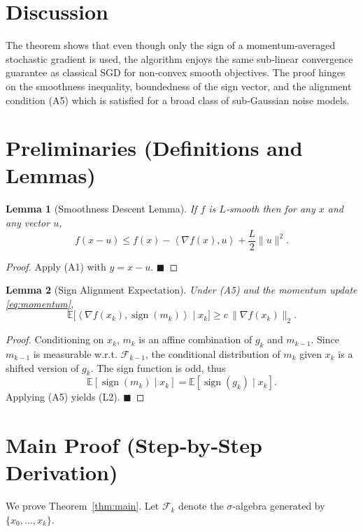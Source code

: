 \documentclass{article}
\newtheorem{lemma}{Lemma}
\newcommand{\sign}{\operatorname{sign}}
\newcommand{\E}{\mathbb{E}}
\newcommand{\inner}[2]{\left\langle #1,#2\right\rangle}
\begin{document}
\section*{Discussion}
The theorem shows that even though only the sign of a momentum‑averaged stochastic gradient is used, the algorithm enjoys the same sub‑linear convergence guarantee as classical SGD for non‑convex smooth objectives. The proof hinges on the smoothness inequality, boundedness of the sign vector, and the alignment condition (A5) which is satisfied for a broad class of sub‑Gaussian noise models.

\newpage
\section*{Preliminaries (Definitions and Lemmas)}
\begin{lemma}[Smoothness Descent Lemma]\label{lem:smooth}
If $f$ is $L$‑smooth then for any $x$ and any vector $u$,
\[
f(x-u)\le f(x)-\inner{\nabla f(x)}{u}+\frac{L}{2}\|u\|^{2}. 
\tag{L1}
\]
\end{lemma}
\begin{proof}
Apply (A1) with $y=x-u$. \hfill $\blacksquare$
\end{proof}

\begin{lemma}[Sign Alignment Expectation]\label{lem:signalign}
Under (A5) and the momentum update \eqref{eq:momentum},
\[
\E\big[\inner{\nabla f(x_k)}{\sign(m_k)}\mid x_k\big]\ge c\,\|\nabla f(x_k)\|_{2}.
\tag{L2}
\]
\end{lemma}
\begin{proof}
Conditioning on $x_k$, $m_k$ is an affine combination of $g_k$ and $m_{k-1}$. Since $m_{k-1}$ is measurable w.r.t. $\mathcal{F}_{k-1}$, the conditional distribution of $m_k$ given $x_k$ is a shifted version of $g_k$. The sign function is odd, thus
\[
\E[\sign(m_k)\mid x_k]=\E[\sign(g_k)\mid x_k].
\]
Applying (A5) yields (L2). \hfill $\blacksquare$
\end{proof}

\section*{Main Proof (Step‑by‑Step Derivation)}
We prove Theorem~\ref{thm:main}. Let $\mathcal{F}_k$ denote the $\sigma$‑algebra generated by $\{x_0,\dots,x_k\}$.
\end{document}
